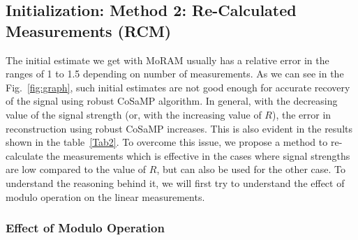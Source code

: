 \subsection{Initialization: Method 2: Re-Calculated Measurements (RCM)}
The initial estimate we get with MoRAM usually has a relative error in the ranges of 1 to 1.5 depending on number of measurements. As we can see in the Fig.~\ref{fig:graph}, such initial estimates are not good enough for accurate recovery of the signal using robust CoSaMP algorithm. In general, with the decreasing value of the signal strength (or, with the increasing value of $R$), the error in reconstruction using robust CoSaMP increases. This is also evident in the results shown in the table~\ref{Tab2}. To overcome this issue, we propose a method to re-calculate the measurements which is effective in the cases where signal strengths are low compared to the value of $R$, but can also be used for the other case. To understand the reasoning behind it, we will first try to understand the effect of modulo operation on the linear measurements.

\subsubsection{Effect of Modulo Operation} 

